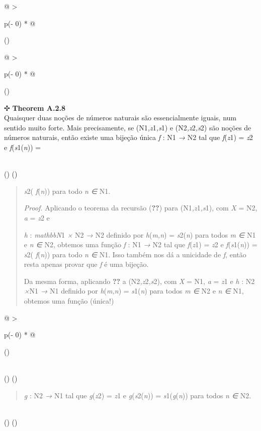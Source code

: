 \documentclass[
]{article}
\begin{document}
\begin{longtable}[]{@{}
  >{\raggedright\arraybackslash}p{(\columnwidth - 0\tabcolsep) * }@{}}
\toprule()
\begin{minipage}[b]{\linewidth}\raggedright
\begin{longtable}[]{@{}
  >{\raggedright\arraybackslash}p{(\columnwidth - 0\tabcolsep) * }@{}}
\toprule()
\begin{minipage}[b]{\linewidth}\raggedright
✣ \textbf{Theorem A.2.8}\\
Quaisquer duas noções de números naturais são essencialmente iguais, num
sentido muito forte. Mais precisamente, se (N1\emph{,z}1\emph{,s}1) e
(N2\emph{,z}2\emph{,s}2) são noções de números naturais, então existe
uma bijeção única \emph{f} : N1 \emph{→} N2 tal que \emph{f}(\emph{z}1)
= \emph{z}2 e \emph{f}(\emph{s}1(\emph{n})) =\strut
\end{minipage} \\
\midrule()
\endhead
\bottomrule()
\end{longtable}

\begin{quote}
\emph{s}2( \emph{f}(\emph{n})) para todo \emph{n ∈} N1.

\emph{Proof.} Aplicando o teorema da recursão (\textbf{??}) para
(N1\emph{,z}1\emph{,s}1), com \emph{X} = N2, \emph{a} = \emph{z}2 e

\emph{h} : \emph{mathbbN}1 \emph{×} N2 \emph{→} N2 definido por
\emph{h}(\emph{m,n}) = \emph{s}2(\emph{n}) para todos \emph{m ∈} N1 e
\emph{n ∈} N2, obtemos uma função \emph{f} : N1 \emph{→} N2 tal que
\emph{f}(\emph{z}1) = \emph{z}2 e \emph{f}(\emph{s}1(\emph{n})) =
\emph{s}2( \emph{f}(\emph{n})) para todo \emph{n ∈} N1. Isso também nos
dá a unicidade de \emph{f}, então resta apenas provar que \emph{f} é uma
bijeção.

Da mesma forma, aplicando \textbf{??} a (N2\emph{,z}2\emph{,s}2), com
\emph{X} = N1, \emph{a} = \emph{z}1 e \emph{h} : N2 \emph{×}N1 \emph{→}
N1 definido por \emph{h}(\emph{m,n}) = \emph{s}1(\emph{n}) para todos
\emph{m ∈} N2 e \emph{n ∈} N1, obtemos uma função (única!)
\end{quote}

\begin{longtable}[]{@{}
  >{\raggedright\arraybackslash}p{(\columnwidth - 0\tabcolsep) * }@{}}
\toprule()
\begin{minipage}[b]{\linewidth}\raggedright
\end{minipage} \\
\midrule()
\endhead
\bottomrule()
\end{longtable}

\begin{quote}
\emph{g} : N2 \emph{→} N1 tal que \emph{g}(\emph{z}2) = \emph{z}1 e
\emph{g}(\emph{s}2(\emph{n})) = \emph{s}1(\emph{g}(\emph{n})) para todos
\emph{n ∈} N2.
\end{quote}\strut
\end{minipage} \\
\midrule()
\endhead
\bottomrule()
\end{longtable}
\end{document}
